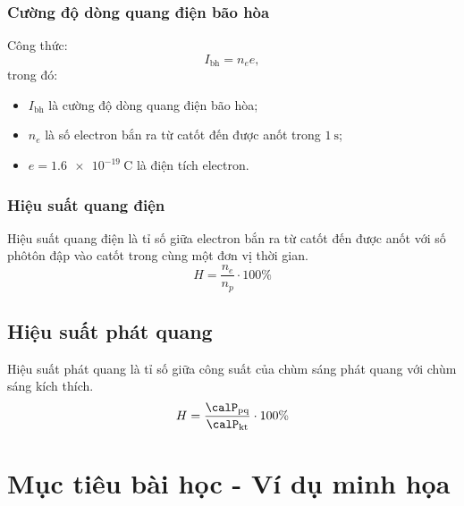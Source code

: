 \subsubsection{Cường độ dòng quang điện bão hòa}
	Công thức:
	\begin{equation}
		I_\text{bh}=n_e e,
	\end{equation}
trong đó:
	\begin{itemize}
		\item $I_\text{bh}$ là cường độ dòng quang điện bão hòa;
		\item $n_e$ là số electron bắn ra từ catốt đến được anốt trong $\SI{1}{\second}$;
		\item $e=\SI{1.6e-19}{\coulomb}$ là điện tích electron.
\end{itemize}	
\subsubsection{Hiệu suất quang điện}
	Hiệu suất quang điện là tỉ số giữa electron bắn ra từ catốt đến được anốt với số phôtôn đập vào catốt trong cùng một đơn vị thời gian.
	\begin{equation}
		H = \dfrac{n_e}{n_p} \cdot 100 \%
	\end{equation}

\subsection{Hiệu suất phát quang}
Hiệu suất phát quang là tỉ số giữa công suất của chùm sáng phát quang với chùm sáng kích thích.
\begin{equation}
	H = \dfrac{\calP_\text{pq}}{\calP_\text{kt}} \cdot 100 \%
\end{equation}

\section{Mục tiêu bài học - Ví dụ minh họa}

